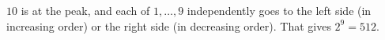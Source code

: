 $10$ is at the peak, and each of $1,\dots,9$ independently goes to the left side (in increasing order) or the right side (in decreasing order). That gives $2^9=\boxed{512}$.
